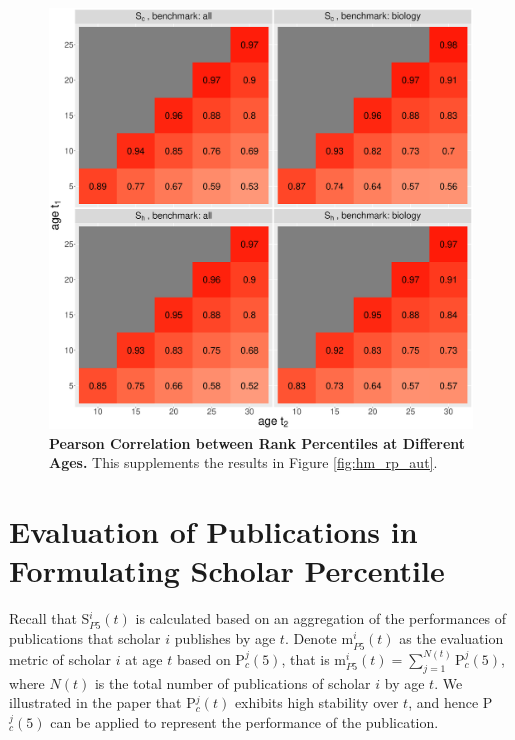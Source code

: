 \begin{refsection}
\begin{figure}[ht!]
    \centering
    \includegraphics[width=\textwidth]{figures/pred_power/heatmap_cor_aut_cithindex.eps}
    \caption{{\bf Pearson Correlation between Rank Percentiles at Different Ages.} 
    This supplements the results in Figure \ref{fig:hm_rp_aut}.}
    \label{fig:hm_autrp_current}
\end{figure}



\section{Evaluation of Publications in Formulating Scholar Percentile}
\label{sec:suppl_pubrp_sp5}

Recall that S$_{P5}^{i}(t)$ is calculated based on an aggregation of the performances of publications that scholar $i$ publishes by age $t$. Denote $\text{m}_{P5}^{i}(t)$ as the evaluation metric of scholar $i$ at age $t$ based on $\text{P}_{c}^{j}(5)$, that is $\text{m}_{P5}^{i}(t)= \sum_{j=1}^{N(t)} \text{P}_{c}^{j}(5)$, where $N(t)$ is the total number of publications of scholar $i$ by age $t$. We illustrated in the paper that P$_c^j(t)$ exhibits high stability over $t$, and hence P$_{c}^{j}(5)$ can be applied to represent the performance of the publication. 


\end{refsection}
